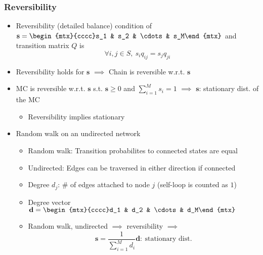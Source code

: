 \subsubsection*{Reversibility}
\begin{itemize}
    \item Reversibility (detailed balance) condition of $\mathbf{s}=\begin{mtx}{cccc}s_1 & s_2 & \cdots & s_M\end{mtx}$ and transition matrix $Q$ is
    \begin{equation}
        \forall i,j\in S,~s_iq_{ij}=s_jq_{ji}
    \end{equation}
    \item Reversibility holds for $\mathbf{s}$ $\implies$ Chain is reversible w.r.t. $\mathbf{s}$
    \item MC is reversible w.r.t. $\mathbf{s}$ s.t. $\mathbf{s}\geq 0$ and $\sum_{i=1}^Ms_i=1$ $\implies$ $\mathbf{s}$: stationary dist. of the MC
    \begin{itemize}
        \item Reversibility implies stationary
    \end{itemize}
    \item Random walk on an undirected network
    \begin{itemize}
        \item Random walk: Transition probabilites to connected states are equal
        \item Undirected: Edges can be traversed in either direction if connected
        \item Degree $d_j$: \# of edges attached to node $j$ (self-loop is counted as $1$)
        \item Degree vector $\mathbf{d}=\begin{mtx}{cccc}d_1 & d_2 & \cdots & d_M\end{mtx}$
        \item Random walk, undirected $\implies$ reversibility $\implies$
        \begin{equation}
            \mathbf{s}=\frac{1}{\sum_{i=1}^Md_i}\mathbf{d}:~\text{stationary dist.}
        \end{equation}
    \end{itemize}
\end{itemize}
